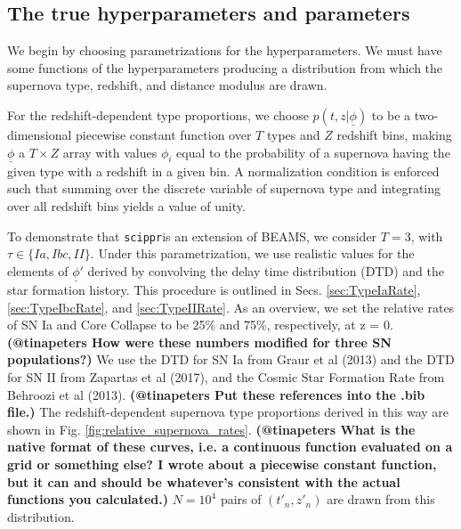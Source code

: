 \documentclass[12pt, onecolumn]{emulateapj}
\newcommand{\textul}{\underline}
\newcommand{\scippr}{\texttt{scippr}}
\begin{document}
\subsection{The true hyperparameters and parameters}
\label{sec:true_hypers}

We begin by choosing parametrizations for the hyperparameters.  We must have some functions of the hyperparameters producing a distribution from which the supernova type, redshift, and distance modulus are drawn.  

For the redshift-dependent type proportions, we choose $p(t, z | \textul{\phi})$ to be a two-dimensional piecewise constant function over $T$ types and $Z$ redshift bins, making $\textul{\phi}$ a $T\times Z$ array with values $\phi_{i}$ equal to the probability of a supernova having the given type with a redshift in a given bin.  A normalization condition is enforced such that summing over the discrete variable of supernova type and integrating over all redshift bins yields a value of unity.  

To demonstrate that \scippr is an extension of BEAMS, we consider $T=3$, with $\tau\in\{Ia, Ibc, II\}$.  Under this parametrization, we use realistic values for the elements of $\textul{\phi}'$ derived by convolving the delay time distribution (DTD) and the star formation history.  This procedure is outlined in Secs. \ref{sec:TypeIaRate}, \ref{sec:TypeIbcRate}, and \ref{sec:TypeIIRate}.  As an overview, we set the relative rates of SN Ia and Core Collapse to be 25\% and 75\%, respectively, at z = 0.  \textbf{(@tinapeters How were these numbers modified for three SN populations?)}  We use the DTD for SN Ia from Graur et al (2013) and the DTD for SN II from Zapartas et al (2017), and the Cosmic Star Formation Rate from Behroozi et al (2013).  \textbf{(@tinapeters Put these references into the .bib file.)}  The redshift-dependent supernova type proportions derived in this way are shown in Fig. \ref{fig:relative_supernova_rates}.  \textbf{(@tinapeters What is the native format of these curves, i.e. a continuous function evaluated on a grid or something else?  I wrote about a piecewise constant function, but it can and should be whatever's consistent with the actual functions you calculated.)}  $N=10^{4}$ pairs of $(t'_{n}, z'_{n})$ are drawn from this distribution.
\end{document}
